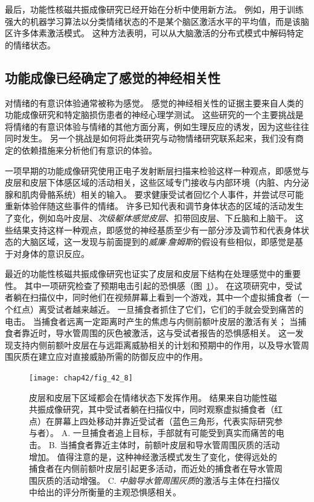 最后，功能性核磁共振成像研究已经开始在分析中使用新方法。
例如，用于训练强大的机器学习算法以分类情绪状态的不是某个脑区激活水平的平均值，而是该脑区许多体素激活模式。
这种方法表明，可以从大脑激活的分布式模式中解码特定的情绪状态。



\subsection{功能成像已经确定了感觉的神经相关性}

对情绪的有意识体验通常被称为感觉。
感觉的神经相关性的证据主要来自人类的功能成像研究和特定脑损伤患者的神经心理学测试。
这些研究的一个主要挑战是将情绪的有意识体验与情绪的其他方面分离，例如生理反应的诱发，因为这些往往同时发生。
另一个挑战是如何将此类研究与动物情绪研究联系起来，我们没有商定的依赖措施来分析他们有意识的体验。


一项早期的功能成像研究使用正电子发射断层扫描来检验这样一种观点，即感觉与皮层和皮层下体感区域的活动相关，这些区域专门接收与内部环境（内脏、内分泌腺和肌肉骨骼系统）相关的输入。
要求健康受试者回忆个人事件，并尝试尽可能重新体验伴随这些事件的情绪。
许多已知代表和调节身体状态的区域的活动发生了变化，例如岛叶皮层、\textit{次级躯体感觉皮层}、扣带回皮层、下丘脑和上脑干。
这些结果支持这样一种观点，即感觉的神经基质至少有一部分涉及调节和代表身体状态的大脑区域，这一发现与前面提到的\textit{威廉$\cdot$詹姆斯}的假设有些相似，即感觉是基于对身体的意识反应。


最近的功能性核磁共振成像研究也证实了皮层和皮层下结构在处理感觉中的重要性。
其中一项研究检查了预期电击引起的恐惧感（图~\ref{fig:42_8}）。
在这项研究中，受试者躺在扫描仪中，同时他们在视频屏幕上看到一个游戏，其中一个虚拟捕食者（一个红点）离受试者越来越近。
一旦捕食者抓住了它们，它们的手就会受到痛苦的电击。
当捕食者远离一定距离时产生的焦虑与内侧前额叶皮层的激活有关；
当捕食者靠近时，导水管周围的灰色被激活，这与受试者报告的恐惧感相关。
这一发现支持内侧前额叶皮层在与远距离威胁相关的计划和预期中的作用，以及导水管周围灰质在建立应对直接威胁所需的防御反应中的作用。


\begin{figure}[htbp]
	\centering
	\texttt{[image: chap42/fig\_42\_8]}
	\caption{皮层和皮层下区域都会在情绪状态下发挥作用。
		结果来自功能性磁共振成像研究，其中受试者躺在扫描仪中，同时观察虚拟捕食者（红点）在屏幕上四处移动并靠近受试者（蓝色三角形，代表实际研究参与者）。
		A. 一旦捕食者追上目标，手部就有可能受到真实而痛苦的电击。
		B. 当捕食者靠近主体时，前额叶皮层和导水管周围灰质的活动增加。
		值得注意的是，这种神经激活模式发生了变化，使得远处的捕食者在内侧前额叶皮层引起更多活动，而近处的捕食者在导水管周围灰质的活动增强。
		C. \textit{中脑导水管周围灰质}的激活与主体在扫描仪中给出的评分所衡量的主观恐惧感相关。}
	\label{fig:42_8}
\end{figure}


